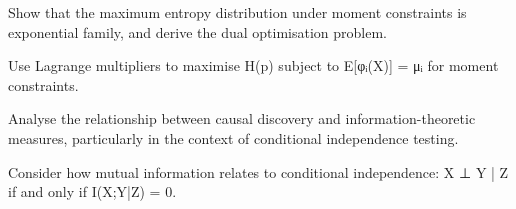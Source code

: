 \begin{exercisebox}[hard]
\begin{problem}
Show that the maximum entropy distribution under moment constraints is exponential family, and derive the dual optimisation problem.
\end{problem}
\begin{hintbox}
Use Lagrange multipliers to maximise H(p) subject to E[φᵢ(X)] = μᵢ for moment constraints.
\end{hintbox}
\end{exercisebox}


\begin{exercisebox}[hard]
\begin{problem}
Analyse the relationship between causal discovery and information-theoretic measures, particularly in the context of conditional independence testing.
\end{problem}
\begin{hintbox}
Consider how mutual information relates to conditional independence: X ⊥ Y | Z if and only if I(X;Y|Z) = 0.
\end{hintbox}
\end{exercisebox}


